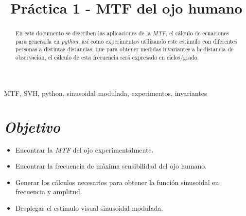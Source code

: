 \documentclass[conference]{IEEEtran}
\begin{document}
\title{Práctica 1 - MTF del ojo humano}


\author{
\and
{}

}

\maketitle


\begin{abstract}
En este documento se describen las aplicaciones de la \textit{MTF}, el cálculo de ecuaciones para generarla en \textit{python}, así como experimentos utilizando este estímulo con diferentes personas a distintas distancias, que para obtener medidas invariantes a la distancia de observación, el cálculo de esta frecuencia será expresado en ciclos/grado.
\end{abstract}

\begin{IEEEkeywords}
MTF, SVH, python, sinusoidal modulada, experimentos, invariantes
\end{IEEEkeywords}


\section{\textit{Objetivo}}


\begin{itemize}
\item Encontrar la \textit{MTF} del ojo experimentalmente.
\item Encontrar la frecuencia de máxima sensibilidad del ojo humano.
\item Generar los cálculos necesarios para obtener la función sinusoidal en frecuencia y amplitud.
\item Desplegar el estímulo visual sinusoidal modulada.
\end{itemize}
\end{document}

